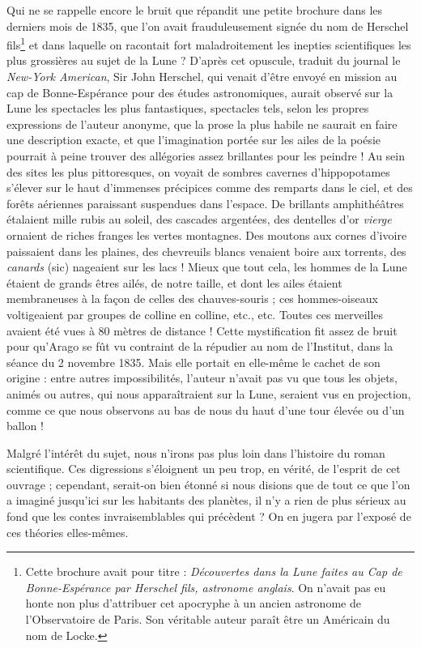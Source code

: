 \documentclass[a4paper, 11pt, oneside, landscape]{article}
\begin{document}
Qui ne se rappelle encore le bruit que répandit une petite brochure dans les derniers mois de 1835, que l'on avait frauduleusement signée du nom de Herschel fils\footnote{Cette brochure avait pour titre : \emph{Découvertes dans la Lune faites au Cap de Bonne-Espérance par Herschel fils, astronome anglais}. On n'avait pas eu honte non plus d'attribuer cet apocryphe à un ancien astronome de l'Observatoire de Paris. Son véritable auteur paraît être un Américain du nom de Locke.} et dans laquelle on racontait fort maladroitement les inepties scientifiques les plus grossières au sujet de la Lune ? D'après cet opuscule, traduit du journal le \emph{New-York American}, Sir John Herschel, qui venait d'être envoyé en mission au cap de Bonne-Espérance pour des études astronomiques, aurait observé sur la Lune les spectacles les plus fantastiques, spectacles tels, selon les propres expressions de l'auteur anonyme, que la prose la plus habile ne saurait en faire une description exacte, et que l'imagination portée sur les ailes de la poésie pourrait à peine trouver des allégories assez brillantes pour les peindre ! Au sein des sites les plus pittoresques, on voyait de sombres cavernes d'hippopotames s'élever sur le haut d'immenses précipices comme des remparts dans le ciel, et des forêts aériennes paraissant suspendues dans l'espace. De brillants amphithéâtres étalaient mille rubis au soleil, des cascades argentées, des dentelles d'or \emph{vierge} ornaient de riches franges les vertes montagnes. Des moutons aux cornes d'ivoire paissaient dans les plaines, des chevreuils blancs venaient boire aux torrents, des \emph{canards} (sic) nageaient sur les lacs ! Mieux que tout cela, les hommes de la Lune étaient de grands êtres ailés, de notre taille, et dont les ailes étaient membraneuses à la façon de celles des chauves-souris ; ces hommes-oiseaux voltigeaient par groupes de colline en colline, etc., etc. Toutes ces merveilles avaient été vues à 80 mètres de distance ! Cette mystification fit assez de bruit pour qu'Arago se fût vu contraint de la répudier au nom de l'Institut, dans la séance du 2 novembre 1835. Mais elle portait en elle-même le cachet de son origine : entre autres impossibilités, l'auteur n'avait pas vu que tous les objets, animés ou autres, qui nous apparaîtraient sur la Lune, seraient vus en projection, comme ce que nous observons au bas de nous du haut d'une tour élevée ou d'un ballon !

Malgré l'intérêt du sujet, nous n'irons pas plus loin dans l'histoire du roman scientifique. Ces digressions s'éloignent un peu trop, en vérité, de l'esprit de cet ouvrage ; cependant, serait-on bien étonné si nous disions que de tout ce que l'on a imaginé jusqu'ici sur les habitants des planètes, il n'y a rien de plus sérieux au fond que les contes invraisemblables qui précèdent ? On en jugera par l'exposé de ces théories elles-mêmes.
\end{document}
